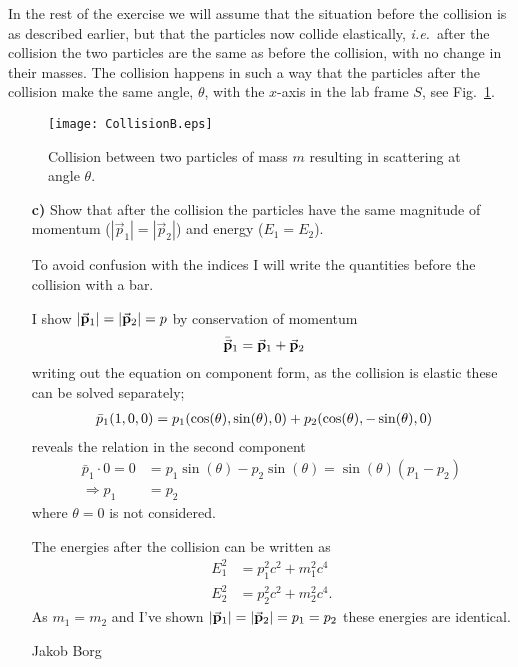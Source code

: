 \documentclass[11pt,a4paper]{report}
\newcounter{excount}[chapter]
\newenvironment{exercise}[1][]{\addtocounter{excount}{1} \noindent {\bf Problem
    \arabic{excount} \ \ #1}\hspace{2mm}}{\vspace{4mm}}
\newenvironment{solution}[1][]
    {\begin{tcolorbox}[title=Solution #1,halign lower=right,breakable]
    }
    {
    \tcblower Jakob Borg
    \end{tcolorbox}
	\vspace{5mm}
    }
\newcommand{\cost}
{
\cos(\theta)
}
\newcommand{\sint}
{
\sin(\theta)
}
\begin{document}
\begin{exercise}
In the rest of the exercise we will assume that the situation before the collision is as described earlier, but that the particles now collide elastically, {\it i.e.}\ after the collision the two particles are the same as before the collision, with no change in their masses. The collision happens in such a way that the particles after the collision make the same angle, $\theta$, with the $x$-axis in the lab frame $S$, see Fig.~\ref{fig:CollisionB}.

\begin{figure}[h]
\begin{center}
\texttt{[image: CollisionB.eps]}
\end{center}
\caption{Collision between two particles of mass $m$ resulting in scattering at angle $\theta$.}
\label{fig:CollisionB}
\end{figure}

\begin{itemize}
\item[\bf c)] Show that after the collision the particles have the same magnitude of momentum ($|\vec p_1|=|\vec p_2|$) and energy ($E_1=E_2$).
\begin{solution}[\bf 2.c]
To avoid confusion with the indices I will write the quantities before the collision with a bar.

I show $|\va{ p}_1|=|\va {p}_2| = p$ by conservation of momentum
\begin{align*}
\bar{\va{p}}_1 &= \va{p}_1+\va{p}_2
\end{align*}
writing out the equation on component form, as the collision is elastic these can be solved separately;
\begin{align}
\bar{p}_1\qty(1,0,0) &= p_1\qty(\cost,\sint,0) + p_2\qty(\cost,-\sint,0) \label{eq:P_conserved_component}
\end{align}
reveals the relation in the second component
\begin{align*}
\bar{p}_1\cdot 0 = 0 &= p_1\sint - p_2\sint = \sint (p_1-p_2)
\\
\Rightarrow p_1 &= p_2
\end{align*}
where $\theta=0$ is not considered.

The energies after the collision can be written as 
\begin{equation}
\begin{aligned}
E_1^2 &= p_1^2 c^2+m_1^2c^4
\\
E_2^2 &= p_2^2 c^2+m_2^2c^4. \label{eq:Energies_after}
\end{aligned}
\end{equation}
As $m_1=m_2$ and I've shown $|\va{p}_1|=|\va{p}_2| = p_1 =  p_2$ these energies are identical.


\end{solution}
\end{itemize}
\end{exercise}
\end{document}
